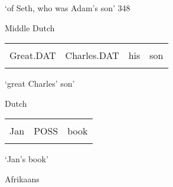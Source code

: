 \begin{styleTranslation}
‘of Seth, who was Adam’s son’ 348

\end{styleTranslation}

\begin{listWWNumileveli}
\item {}

\begin{styleExample}
Middle Dutch

\end{styleExample}

\end{listWWNumileveli}

\begin{tabular}{llll}
\lsptoprule
\multicolumn{4}{l}{Grote

}\\
Great.DAT & Charles.DAT & his & son\\
\lspbottomrule
\end{tabular}

\begin{styleTranslation}
‘great Charles’ son’

\end{styleTranslation}

\begin{listWWNumileveli}
\item {}

\begin{styleExample}
Dutch

\end{styleExample}

\end{listWWNumileveli}

\begin{tabular}{lll}
\lsptoprule
\multicolumn{3}{l}{Jan

}\\
Jan & POSS & book\\
\lspbottomrule
\end{tabular}

\begin{styleTranslation}
‘Jan’s book’

\end{styleTranslation}

\begin{listWWNumileveli}
\item {}

\begin{styleExample}
\label{bkm:Ref151373831}Afrikaans 

\end{styleExample}

\end{listWWNumileveli}

